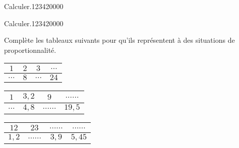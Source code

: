 \begin{pageParcoursu}
\begin{ExoCd}{Calculer.}{1234}{2}{0}{0}{0}{0}

\end{ExoCd}


\begin{ExoCd}{Calculer.}{1234}{2}{0}{0}{0}{0}

Complète les tableaux suivants pour qu'ils représentent à des situations de proportionnalité.

\begin{minipage}{0.3\linewidth}
\begin{tabular}{|c|c|c|c|}
\hline 
$1$ & $2$ & $3$ & $\ldots$  \\ 
\hline 
$\ldots$ & $8$ & $\ldots$ & $24$ \\ 
\hline 
\end{tabular} 
\end{minipage} 
\begin{minipage}{0.33\linewidth}
\begin{tabular}{|c|c|c|c|}
\hline 
$1$ & $3,2$ & $9$ & $\ldots\ldots$  \\ 
\hline 
$\ldots$ & $4,8$ & $\ldots\ldots$ & $19,5$ \\ 
\hline 
\end{tabular} 
\end{minipage} 
\begin{minipage}{0.33\linewidth}
\begin{tabular}{|c|c|c|c|}
\hline 
$12$ & $23$ & $\ldots\ldots$ & $\ldots\ldots$  \\ 
\hline 
$1,2$ & $\ldots\ldots$ & $3,9$ & $5,45$ \\ 
\hline 
\end{tabular} 
\end{minipage} 

\end{ExoCd}

\end{pageParcoursu}
